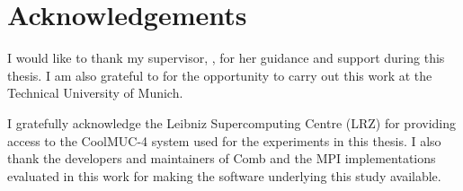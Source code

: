 
\chapter{Acknowledgements}

I would like to thank my supervisor, \getSupervisor{}, for her guidance
and support during this thesis. I am also grateful to
\getExaminer{} for the opportunity to carry out this work at the
Technical University of Munich.

I gratefully acknowledge the Leibniz Supercomputing Centre (LRZ) for
providing access to the CoolMUC-4 system used for the experiments in
this thesis. I also thank the developers and maintainers of Comb and
the MPI implementations evaluated in this work for making the software
underlying this study available.

\cleardoublepage{}
